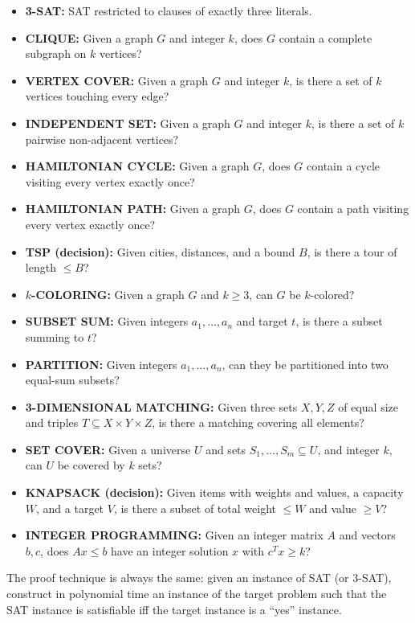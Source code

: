 \begin{itemize}
  \item \textbf{3-SAT:} SAT restricted to clauses of exactly three literals.
  \item \textbf{CLIQUE:} Given a graph $G$ and integer $k$, does $G$ contain a complete subgraph on $k$ vertices?
  \item \textbf{VERTEX COVER:} Given a graph $G$ and integer $k$, is there a set of $k$ vertices touching every edge?
  \item \textbf{INDEPENDENT SET:} Given a graph $G$ and integer $k$, is there a set of $k$ pairwise non-adjacent vertices?
  \item \textbf{HAMILTONIAN CYCLE:} Given a graph $G$, does $G$ contain a cycle visiting every vertex exactly once?
  \item \textbf{HAMILTONIAN PATH:} Given a graph $G$, does $G$ contain a path visiting every vertex exactly once?
  \item \textbf{TSP (decision):} Given cities, distances, and a bound $B$, is there a tour of length $\leq B$?
  \item \textbf{$k$-COLORING:} Given a graph $G$ and $k \geq 3$, can $G$ be $k$-colored?
  \item \textbf{SUBSET SUM:} Given integers $a_1, \ldots, a_n$ and target $t$, is there a subset summing to $t$?
  \item \textbf{PARTITION:} Given integers $a_1, \ldots, a_n$, can they be partitioned into two equal-sum subsets?
  \item \textbf{3-DIMENSIONAL MATCHING:} Given three sets $X, Y, Z$ of equal size and triples $T \subseteq X \times Y \times Z$, is there a matching covering all elements?
  \item \textbf{SET COVER:} Given a universe $U$ and sets $S_1, \ldots, S_m \subseteq U$, and integer $k$, can $U$ be covered by $k$ sets?
  \item \textbf{KNAPSACK (decision):} Given items with weights and values, a capacity $W$, and a target $V$, is there a subset of total weight $\leq W$ and value $\geq V$?
  \item \textbf{INTEGER PROGRAMMING:} Given an integer matrix $A$ and vectors $b, c$, does $Ax \leq b$ have an integer solution $x$ with $c^T x \geq k$?
\end{itemize}

The proof technique is always the same: given an instance of SAT (or 3-SAT), construct in polynomial time an instance of the target problem such that the SAT instance is satisfiable iff the target instance is a ``yes'' instance.

